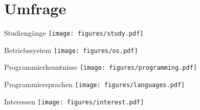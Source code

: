 \section{Umfrage}


\begin{frame}{Studiengänge}
  \flushright
  \texttt{[image: figures/study.pdf]}
\end{frame}

\begin{frame}{Betriebssystem}
  \flushright
  \texttt{[image: figures/os.pdf]}
\end{frame}

\begin{frame}{Programmierkenntnisse}
  \flushleft
  \texttt{[image: figures/programming.pdf]}
\end{frame}

\begin{frame}{Programmiersprachen}
  \centering
  \texttt{[image: figures/languages.pdf]}
\end{frame}

\begin{frame}{Interessen}
  \centering
  \texttt{[image: figures/interest.pdf]}
\end{frame}